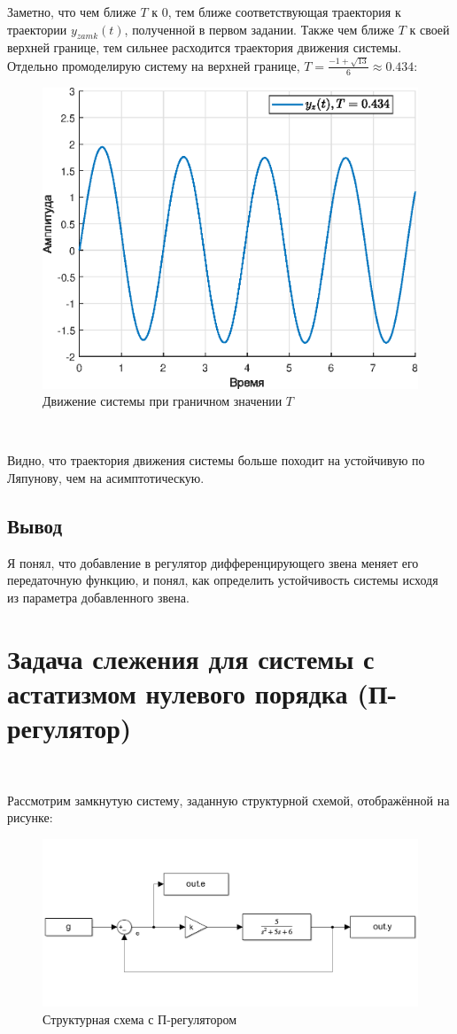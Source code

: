 \documentclass[a4paper]{article}
\begin{document}
Заметно, что чем ближе $T$ к 0, тем ближе соответствующая траектория к траектории $y_{zamk}(t)$, полученной в первом задании. Также чем ближе $T$ к своей верхней границе, тем сильнее расходится траектория движения системы. Отдельно промоделирую систему на верхней границе, $T = \frac{-1 + \sqrt{13}}{6}\approx 0.434$:

\begin{figure}[H]
    \centering
    \includegraphics[width=0.65\linewidth]{ex2/0.434.eps}
    \caption{Движение системы при граничном значении $T$}
\end{figure}\

Видно, что траектория движения системы больше походит на устойчивую по Ляпунову, чем на асимптотическую.

\subsection{Вывод}

Я понял, что добавление в регулятор дифференцирующего звена меняет его передаточную функцию, и понял, как определить устойчивость системы исходя из параметра добавленного звена. 

\section{Задача слежения для системы с астатизмом нулевого порядка (П-регулятор)}\

Рассмотрим замкнутую систему, заданную структурной схемой, отображённой на рисунке:

\begin{figure}[H]
    \centering
    \includegraphics[width=0.65\linewidth]{ex3/image.png}
    \caption{Структурная схема с П-регулятором}
\end{figure}\
\end{document}
